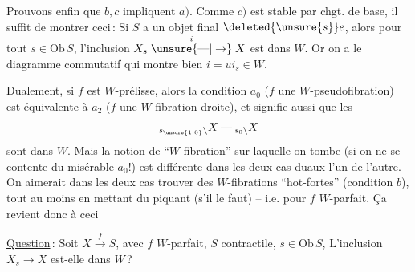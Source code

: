 
Prouvons enfin que $b,c$ impliquent $a)$. Comme $c)$  est stable par chgt. de base, il suffit de montrer ceci\,: Si $S$ a un objet final $\deleted{\unsure{s}}e$, alors pour tout $s\in\mathrm{Ob}\,S$, l'inclusion $X_s\mathrel{\overset{i}{\unsure{\text{---}|\to}}}X$ est dans $W$. Or on a le diagramme commutatif
qui montre bien $i=ui_s\in W$.

 Dualement, si $f$ est $W$-prélisse, alors   la condition $a_0$ ($f$ une $W$-pseudofibration) est équivalente à $a_2$ ($f$ une $W$-fibration droite), et signifie aussi que les
\[
{}_{s_{\unsure{1|0}}\backslash}X\mathbin{\text{---}}{}_{s_0\backslash}X
\]
sont dans $W$. Mais la notion de ``$W$-fibration'' sur laquelle on tombe (si on ne se contente du misérable $a_0$!) est différente dans les deux cas duaux l'un de l'autre. On aimerait dans les deux cas trouver des $W$-fibrations ``hot-fortes'' (condition $b$), tout au moins en mettant du piquant (s'il le faut) -- i.e. pour $f$ $W$-parfait. Ça revient donc à ceci

\uline{Question}\,: Soit $X\xrightarrow{f}S$, avec $f$ $W$-parfait, $S$ contractile, $s\in\mathrm{Ob}\,S$, L'inclusion $X_s\to X$ est-elle dans $W$\,?


